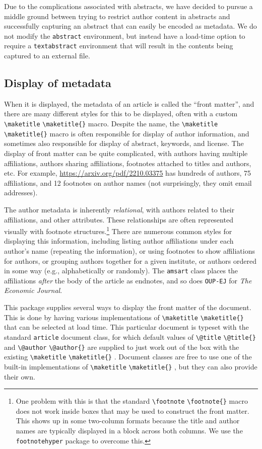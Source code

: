 \documentclass{article}
\newcommand{\cmd}[2][]{%
  \def\FirstArg{#1}%
  \ifx\FirstArg\empty%
    \texttt{\textbackslash{}#2}%
  \else%
    \texttt{\textbackslash{}#2\{#1\}}%
  \fi
}
\newcommand{\pkg}[1]{\texttt{#1}}
\begin{document}
Due to the complications associated with abstracts, we have decided to
pursue a middle ground between trying to restrict author content in
abstracts and successfully capturing an abstract that can easily be
encoded as metadata. We do not modify the \texttt{abstract}
environment, but instead have a load-time option to require
a \texttt{textabstract} environment that will result in the contents
being captured to an external file.

\subsection{Display of metadata}\label{maketitle}
When it is displayed, the metadata of an article is called the ``front
matter'', and there are many different styles for this to be
displayed, often with a custom \cmd{maketitle} macro. Despite the
name, the \cmd{maketitle} macro is often responsible for display of
author information, and sometimes also responsible for display of
abstract, keywords, and license. The display of front matter can be
quite complicated, with authors having multiple affiliations, authors
sharing affiliations, footnotes attached to titles and authors,
etc. For example, \url{https://arxiv.org/pdf/2210.03375} has hundreds
of authors, 75 affiliations, and 12 footnotes on author names (not
surprisingly, they omit email addresses).

The author
metadata is inherently {\em relational}, with authors related to their
affiliations, and other attributes. These relationships are often
represented visually with footnote structures.\footnote{One problem
with this is that the standard
\cmd{footnote} macro does not work inside boxes that may be used to construct
the front matter. This shows up in some two-column formats because the
title and author names are typically displayed in a block across both columns.
We use the \texttt{footnotehyper} package to overcome this.}
There are numerous common styles
for displaying this information, including listing author affiliations
under each author's name (repeating the information), or using
footnotes to show affiliations for authors, or grouping authors
together for a given institute, or authors ordered in some way (e.g.,
alphabetically or randomly). The \pkg{amsart} class places the
affiliations {\em after} the body of the article as endnotes, and so
does \pkg{OUP-EJ} for \emph{The Economic Journal}.

This package supplies several ways to display the front matter of the
document.  This is done by having various implementations
of \cmd{maketitle} that can be selected at load time. This particular
document is typeset with the standard \texttt{article} document class,
for which default values of \cmd{@title} and \cmd{@author} are
supplied to just work out of the box with the
existing \cmd{maketitle}. Document classes are free to use one of the
built-in implementations of \cmd{maketitle}, but they can also provide
their own.
\end{document}
